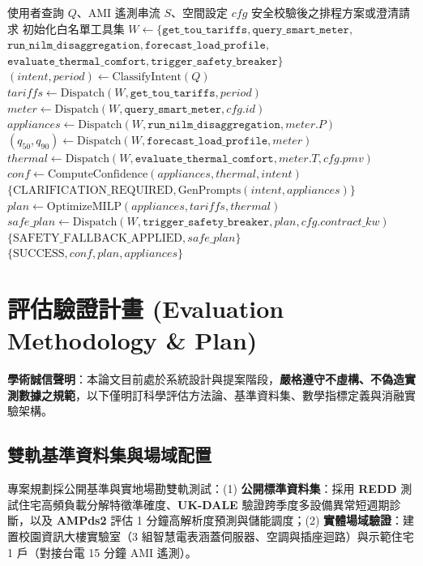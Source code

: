 \documentclass[conference]{IEEEtran}
\begin{document}
\begin{algorithm}[t]
\caption{WattWise Domain AI Agent 推論與安全守門演算法}
\label{alg:wattwise}
\begin{algorithmic}[1]
\Require 使用者查詢 $Q$、AMI 遙測串流 $S$、空間設定 $cfg$
\Ensure 安全校驗後之排程方案或澄清請求
\State 初始化白名單工具集 $W \gets \{\texttt{get\_tou\_tariffs}, \texttt{query\_smart\_meter},$
\Statex \quad $\texttt{run\_nilm\_disaggregation}, \texttt{forecast\_load\_profile},$
\Statex \quad $\texttt{evaluate\_thermal\_comfort}, \texttt{trigger\_safety\_breaker}\}$
\State $(intent, period) \gets \text{ClassifyIntent}(Q)$
\State $tariffs \gets \text{Dispatch}(W, \texttt{get\_tou\_tariffs}, period)$
\State $meter \gets \text{Dispatch}(W, \texttt{query\_smart\_meter}, cfg.id)$
\State $appliances \gets \text{Dispatch}(W, \texttt{run\_nilm\_disaggregation}, meter.P)$
\State $(q_{50}, q_{90}) \gets \text{Dispatch}(W, \texttt{forecast\_load\_profile}, meter)$
\State $thermal \gets \text{Dispatch}(W, \texttt{evaluate\_thermal\_comfort}, meter.T, cfg.pmv)$
\State $conf \gets \text{ComputeConfidence}(appliances, thermal, intent)$
    \State \Return $\{\text{CLARIFICATION\_REQUIRED}, \text{GenPrompts}(intent, appliances)\}$
\EndIf
\State $plan \gets \text{OptimizeMILP}(appliances, tariffs, thermal)$
    \State $safe\_plan \gets \text{Dispatch}(W, \texttt{trigger\_safety\_breaker}, plan, cfg.contract\_kw)$
    \State \Return $\{\text{SAFETY\_FALLBACK\_APPLIED}, safe\_plan\}$
\EndIf
\State \Return $\{\text{SUCCESS}, conf, plan, appliances\}$
\end{algorithmic}
\end{algorithm}

\section{評估驗證計畫 (Evaluation Methodology \& Plan)}

\textbf{學術誠信聲明}：本論文目前處於系統設計與提案階段，\textbf{嚴格遵守不虛構、不偽造實測數據之規範}，以下僅明訂科學評估方法論、基準資料集、數學指標定義與消融實驗架構。

\subsection{雙軌基準資料集與場域配置}
專案規劃採公開基準與實地場勘雙軌測試：(1) \textbf{公開標準資料集}：採用 \textbf{REDD} 測試住宅高頻負載分解特徵準確度、\textbf{UK-DALE} 驗證跨季度多設備異常短週期診斷，以及 \textbf{AMPds2} 評估 1 分鐘高解析度預測與儲能調度；(2) \textbf{實體場域驗證}：建置校園資訊大樓實驗室（3 組智慧電表涵蓋伺服器、空調與插座迴路）與示範住宅 1 戶（對接台電 15 分鐘 AMI 遙測）。
\end{document}
